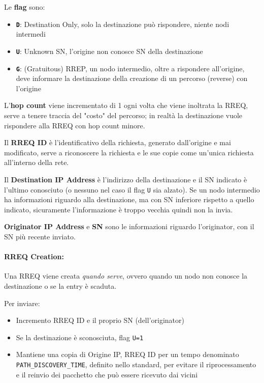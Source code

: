 Le \textbf{flag} sono: 
\begin{itemize}
	\item \textbf{\texttt{D}}: Destination Only, solo la destinazione può rispondere, niente nodi intermedi

	\item \textbf{\texttt{U}}: Unknown SN, l'origine non conosce SN della destinazione

	\item \textbf{\texttt{G}}: (Gratuitous) RREP, un nodo intermedio, oltre a rispondere all'origine, deve informare la destinazione della creazione di un percorso (reverse) con l'origine
\end{itemize}

L'\textbf{hop count} viene incrementato di 1 ogni volta che viene inoltrata la RREQ, serve a tenere traccia del "costo" del percorso; in realtà la destinazione vuole rispondere alla RREQ con hop count minore.

Il \textbf{RREQ ID} è l'identificativo della richiesta, generato dall'origine e mai modificato, serve a riconoscere la richiesta e le sue copie come un'unica richiesta all'interno della rete.

Il \textbf{Destination IP Address} è l'indirizzo della destinazione e il SN indicato è l'ultimo conosciuto (o nessuno nel caso il flag \texttt{U} sia alzato). Se un nodo intermedio ha informazioni riguardo alla destinazione, ma con SN inferiore rispetto a quello indicato, sicuramente l'informazione è troppo vecchia quindi non la invia.

\textbf{Originator IP Address} e \textbf{SN} sono le informazioni riguardo l'originator, con il SN più recente inviato.

\paragraph{RREQ Creation:} Una RREQ viene creata \textit{quando serve}, ovvero quando un nodo non conosce la destinazione o se la entry è scaduta. 

Per inviare:
\begin{itemize}
	\item Incremento RREQ ID e il proprio SN (dell'originator)
	
    \item Se la destinazione è sconosciuta, flag \texttt{U=1}
	
    \item Mantiene una copia di Origine IP, RREQ ID per un tempo denominato \texttt{PATH\_DISCOVERY\_TIME}, definito nello standard, per evitare il riprocessamento e il reinvio dei pacchetto che può essere ricevuto dai vicini
\end{itemize}


